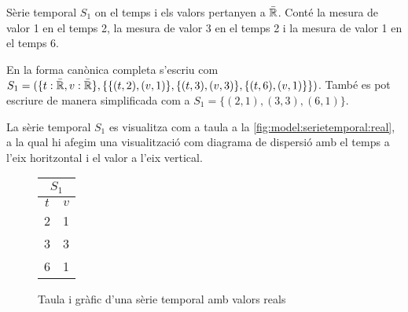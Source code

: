 \begin{example}
  Sèrie temporal $S_1$ on el temps i els valors pertanyen a
  $\bar{\mathbb{R}{}}$. Conté la mesura de valor 1 en el temps 2, la mesura de
  valor 3 en el temps 2 i la mesura de valor 1 en el temps 6.

En la forma canònica completa s'escriu com $S_1 = ( \{t:
\bar{\mathbb{R}{}}, v: \bar{\mathbb{R}{}}\}, \{ \{(t,2),(v,1)\}, \{(t,3),(v,3)\},
\{(t,6),(v,1)\} \} )$. També es pot escriure de manera simplificada com a
$S_1 = \{ (2,1), (3,3), (6,1) \}$.


La sèrie temporal $S_1$ es visualitza com a taula a la
\autoref{fig:model:serietemporal:real}, a la qual hi afegim una
visualització com diagrama de dispersió amb el temps a l'eix
horitzontal i el valor a l'eix vertical.

\begin{figure}[tp]
  \centering
  \begin{tabular}[c]{|c|c|}
    \multicolumn{2}{c}{$S_1$} \\ \hline
    $t$  & $v$ \\ \hline
    2  & 1 \\
    3  & 3 \\
    6  & 1 \\ \hline
  \end{tabular} \qquad
  \caption{Taula i gràfic d'una sèrie temporal amb valors reals}
  \label{fig:model:serietemporal:real}
\end{figure}

\end{example}


